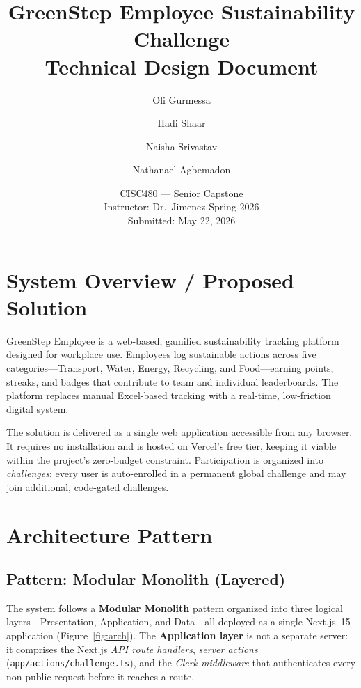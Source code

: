 \documentclass[11pt]{article}
\title{\textbf{GreenStep Employee Sustainability Challenge}\\[0.4em]
\large Technical Design Document}
\author{Oli Gurmessa \and Hadi Shaar \and Naisha Srivastav \and Nathanael Agbemadon}
\date{CISC480 --- Senior Capstone\\[0.3em]
Instructor: Dr.\ Jimenez \quad\textbullet\quad Spring 2026\\[0.3em]
Submitted: May 22, 2026}
\begin{document}
\maketitle
\tableofcontents
\newpage

\section{System Overview / Proposed Solution}

GreenStep Employee is a web-based, gamified sustainability tracking platform
designed for workplace use. Employees log sustainable actions across five
categories---Transport, Water, Energy, Recycling, and Food---earning points,
streaks, and badges that contribute to team and individual leaderboards. The
platform replaces manual Excel-based tracking with a real-time, low-friction
digital system.

The solution is delivered as a single web application accessible from any
browser. It requires no installation and is hosted on Vercel's free tier,
keeping it viable within the project's zero-budget constraint. Participation is
organized into \emph{challenges}: every user is auto-enrolled in a permanent
global challenge and may join additional, code-gated challenges.

\section{Architecture Pattern}

\subsection{Pattern: Modular Monolith (Layered)}

The system follows a \textbf{Modular Monolith} pattern organized into three
logical layers---Presentation, Application, and Data---all deployed as a single
Next.js~15 application (Figure~\ref{fig:arch}). The \textbf{Application layer}
is not a separate server: it comprises the Next.js \emph{API route handlers},
\emph{server actions} (\texttt{app/actions/challenge.ts}), and the
\emph{Clerk middleware} that authenticates every non-public request before it
reaches a route.
\end{document}
